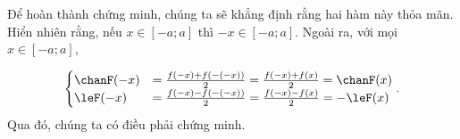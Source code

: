 Để hoàn thành chứng minh, chúng ta sẽ khẳng định rằng hai hàm này thỏa mãn. Hiển nhiên rằng, nếu $x \in [-a; a]$ thì $-x \in [-a; a]$. Ngoài ra, với mọi $x \in [-a; a]$,

\begin{equation*}
   \begin{cases}
      \chanF(-x) &= \frac{f(-x) + f\left(-(-x)\right)}{2} = \frac{f(-x) + f(x)}{2} = \chanF(x) \\
      \leF(-x) &= \frac{f(-x) - f\left(-(-x)\right)}{2} = \frac{f(-x) - f(x)}{2} = -\leF(x)
   \end{cases}.
\end{equation*}
Qua đó, chúng ta có điều phải chứng minh.